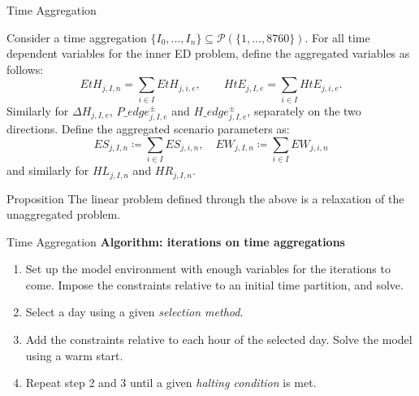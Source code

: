   \begin{frame}{Time Aggregation}


    \small
    Consider a time aggregation $\{I_0,...,I_n\}\subseteq \mathcal{P}(\{1,...,8760\})$.
    For all time dependent variables for the inner ED problem, define the aggregated variables as follows:
    \begin{equation*}
    EtH_{j,I,n} = \sum_{i \in I} EtH_{j,i,e}, \quad\quad HtE_{j,I,e} = \sum_{i \in I} HtE_{j,i,e}.
    \end{equation*}
    Similarly for \(\Delta H_{j,I,e}\), \(P\_edge^\pm_{j,I,e}\) and \(H\_edge^\pm_{j,I,e}\), separately on the two directions.
    Define the aggregated scenario parameters as:
    \[
    ES_{j,I,n} \coloneqq \sum_{i \in I} ES_{j,i,n}, \quad EW_{j,I,n} \coloneqq \sum_{i \in I} EW_{j,i,n}
    \]
    and similarly for \(HL_{j,I,n}\) and \(HR_{j,I,n}\). %
    
    \normalsize
    \begin{block}{Proposition}
      The linear problem defined through the above is a relaxation of the unaggregated problem.
    \end{block}

  \end{frame}
  \begin{frame}{Time Aggregation}
    \textbf{Algorithm: iterations on time aggregations}
    \begin{enumerate}
      \item Set up the model environment with enough variables for the iterations to come. Impose the constraints relative to an initial time partition, and solve.
      \item Select a day using a given \textit{selection method}.
      \item Add the constraints relative to each hour of the selected day. Solve the model using a warm start.
      \item Repeat step 2 and 3 until a given \textit{halting condition} is met.
      \end{enumerate}
  \end{frame}

